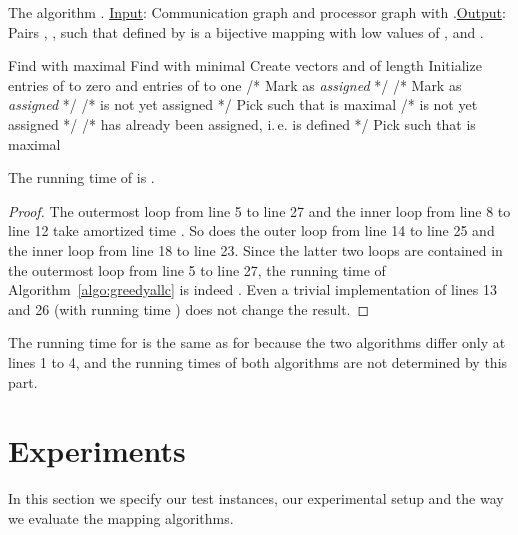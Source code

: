 \documentclass[pdftex]{llncs}
\newcommand{\ie}{i.\,e.\xspace}
\newcommand{\hmey}[1]{\textcolor{red}{[HM: #1]}\xspace}
\renewcommand{\hmey}[1]{}
\begin{document}
\hmey{Latex warning in pseudocode}

\begin{algorithm}[!h]
\caption{The algorithm . \newline \underline{Input}:
  Communication graph  and processor graph
   with .\newline \underline{Output}: Pairs , , such that  defined by
   is a bijective mapping with low values of
  ,  and .}

\label{algo:greedyallc}
\begin{algorithmic}[1]
\State Find  with maximal 
\State Find  with minimal 
\State Create vectors  and  of length 
\State Initialize entries of  to zero and entries of   to one
\For{}
\State  /* Mark  as \emph{assigned} */
\State   /* Mark  as \emph{assigned} */
\ForAll{}
\If{} /*  is not yet assigned */
\State 
\EndIf
\EndFor
\State Pick  such that  is maximal
\For{}
\If{}
\State /*  is not yet assigned */
\State 
\ForAll{}
\If{}
\State /*  has already been assigned, \ie  is defined */
\State 
\EndIf
\EndFor
\EndIf
\EndFor
\State Pick  such that  is maximal
\EndFor
\end{algorithmic}
\end{algorithm}

\begin{proposition}
 The running time of  is .
\label{prop:time}
\end{proposition}

\begin{proof}
The outermost loop from line 5 to line 27 and the inner loop from line
8 to line 12 take amortized time . So does the
outer loop from line 14 to line 25 and the inner loop from
line 18 to line 23. Since the latter two loops are contained in the
outermost loop from line 5 to line 27, the running time of
Algorithm~\ref{algo:greedyallc} is indeed . Even a trivial implementation of lines 13 and 26 (with
running time ) does not change the result.
\end{proof}

The running time for  is the same as for 
because the two algorithms differ only at lines 1 to 4, and the
running times of both algorithms are not determined by this part.


\section{Experiments}
\label{sec:exp}
In this section we specify our test instances, our experimental setup
and the way we evaluate the mapping algorithms.
\end{document}
